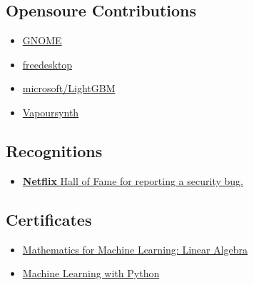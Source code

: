 \documentclass{article}
\begin{document}
 \subsection{Opensoure Contributions}
 \begin{multicols}{2}
 \begin{itemize}
     \item \href{https://gitlab.gnome.org/jkotra}{GNOME}
     \item \href{https://gitlab.freedesktop.org/jkotra}{freedesktop}
     \item \href{https://github.com/microsoft/LightGBM}{microsoft/LightGBM}
     \item \href{https://github.com/vapoursynth/vapoursynth}{Vapoursynth}
 \end{itemize}
\end{multicols}

\subsection{Recognitions}

\begin{itemize}
    \item \href{https://bugcrowd.com/netflix/hall-of-fame}{\textbf{Netflix} Hall of Fame for reporting a security bug.}
\end{itemize}


\subsection{Certificates}

\begin{itemize}
    \item \href{https://www.coursera.org/account/accomplishments/certificate/E2FE7HNXWP8J}{Mathematics for Machine Learning: Linear Algebra}
    \item \href{https://www.coursera.org/account/accomplishments/certificate/QDPTGAQSXZNM}{Machine Learning with Python}
\end{itemize}
\end{document}
